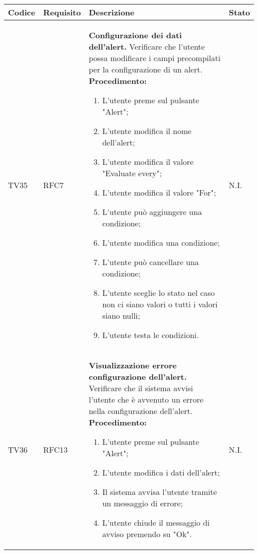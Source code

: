 \begin{table}[!htpb]
	\centering
	\renewcommand{\arraystretch}{2} 
	\begin{tabular}{|l|l|p{10cm}|l|}
		\rowcolor{orange!50}
		\hline
		\textbf{Codice} & \textbf{Requisito}& \textbf{Descrizione} & \textbf{Stato}\\ 
		\hline
		TV35 & RFC7 &
			\textbf{Configurazione dei dati dell'alert.} 
			\newline
			Verificare che l’utente possa modificare i campi precompilati per la configurazione di un alert. 
			\newline 
			\textbf{Procedimento:} 
			\begin{enumerate} 
				\item L’utente preme sul pulsante "Alert";
				\item L’utente modifica il nome dell'alert; 
				\item L'utente modifica il valore "Evaluate every"; 
				\item L'utente modifica il valore "For"; 
				\item L'utente può aggiungere una condizione; 
				\item L'utente modifica una condizione; 
				\item L'utente può cancellare una condizione; 
				\item L'utente sceglie lo stato nel caso non ci siano valori o tutti i valori siano nulli; 
				\item L'utente testa le condizioni.		
			\end{enumerate} 
			& N.I.\\
		\hline
		TV36 & RFC13 &
			\textbf{Visualizzazione errore configurazione dell'alert.} 
			\newline
			Verificare che il sistema avvisi l’utente che è avvenuto un errore nella configurazione dell'alert. 
			\newline 
			\textbf{Procedimento:} 
			\begin{enumerate} 
				\item L’utente preme sul pulsante "Alert";
				\item L'utente modifica i dati dell'alert; 
				\item Il sistema avvisa l’utente tramite un messaggio di errore; 
				\item L'utente chiude il messaggio di avviso premendo su "Ok".		
			\end{enumerate} 
			& N.I.\\
		\hline
	\end{tabular}
\end{table}
